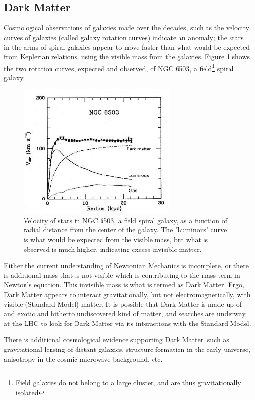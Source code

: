 \documentclass[11pt,a4paper,openright,twoside]{report}
\begin{document}
\subsection{Dark Matter}
Cosmological observations of galaxies made over the decades, such as the velocity curves of galaxies (called galaxy rotation curves) indicate an anomaly; the stars in the arms of spiral galaxies appear to move faster than what would be expected from Keplerian relations, using the visible mass from the galaxies. Figure \ref{fig:grc} shows the two rotation curves, expected and observed, of NGC 6503, a field\footnote{Field galaxies do not belong to a large cluster, and are thus gravitationally isolated}  spiral galaxy.\cite{galaxy}
\begin{figure}[H]
\centering
	\includegraphics[width=0.7\textwidth]{GRC.jpeg}
	\caption{Velocity of stars in NGC 6503, a field spiral galaxy, as a function of radial distance from the center of the galaxy\cite{galaxy}. The 'Luminous' curve is what would be expected from the visible mass, but what is observed is much higher, indicating excess invisible matter.}
	\label{fig:grc}
\end{figure}
Either the current understanding of Newtonian Mechanics is incomplete, or there is additional mass that is not visible which is contributing to the mass term in Newton's equation. This invisible mass is what is termed as Dark Matter. Ergo, Dark Matter appears to interact gravitationally, but not electromagnetically, with visible (Standard Model) matter. It is possible that Dark Matter is made up of and exotic and hitherto undiscovered kind of matter, and searches are underway at the LHC to look for Dark Matter via its interactions with the Standard Model.

There is additional cosmological evidence supporting Dark Matter, such as gravitational lensing of distant galaxies, structure formation in the early universe, anisotropy in the cosmic microwave background, etc.
\end{document}
